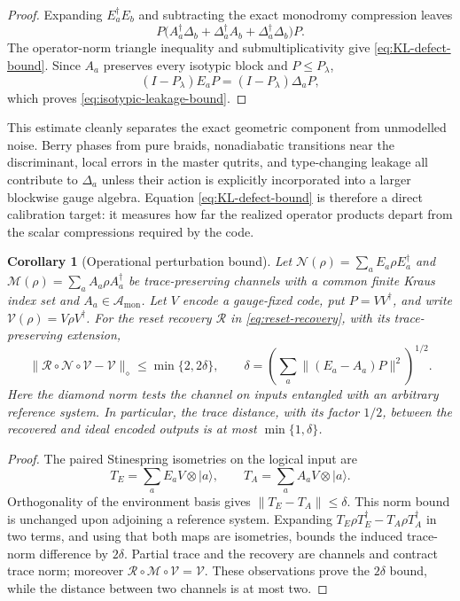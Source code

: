 \documentclass[11pt]{article}
\newtheorem{corollary}[theorem]{Corollary}
\theoremstyle{definition}
\theoremstyle{remark}
\newcommand{\cA}{\mathcal A}
\newcommand{\ket}[1]{\lvert #1\rangle}
\begin{document}
\begin{proof}
Expanding $E_a^\dagger E_b$ and subtracting the exact monodromy compression leaves
\[
 P\big(A_a^\dagger\Delta_b+\Delta_a^\dagger A_b
       +\Delta_a^\dagger\Delta_b\big)P.
\]
The operator-norm triangle inequality and submultiplicativity give \eqref{eq:KL-defect-bound}.  Since $A_a$ preserves every isotypic block and $P\leq P_\lambda$,
\[
 (I-P_\lambda)E_aP=(I-P_\lambda)\Delta_aP,
\]
which proves \eqref{eq:isotypic-leakage-bound}.
\end{proof}

This estimate cleanly separates the exact geometric component from unmodelled noise.  Berry phases from pure braids, nonadiabatic transitions near the discriminant, local errors in the master qutrits, and type-changing leakage all contribute to $\Delta_a$ unless their action is explicitly incorporated into a larger blockwise gauge algebra.  Equation \eqref{eq:KL-defect-bound} is therefore a direct calibration target: it measures how far the realized operator products depart from the scalar compressions required by the code.

\begin{corollary}[Operational perturbation bound]\label{cor:operational-perturbation}
Let $\mathcal N(\rho)=\sum_a E_a\rho E_a^\dagger$ and $\mathcal M(\rho)=\sum_a A_a\rho A_a^\dagger$ be trace-preserving channels with a common finite Kraus index set and $A_a\in\cA_{\mathrm{mon}}$.  Let $V$ encode a gauge-fixed code, put $P=VV^\dagger$, and write $\mathcal V(\rho)=V\rho V^\dagger$.  For the reset recovery $\mathcal R$ in \eqref{eq:reset-recovery}, with its trace-preserving extension,
\begin{equation}\label{eq:diamond-recovery-bound}
 \|\mathcal R\circ\mathcal N\circ\mathcal V-\mathcal V\|_\diamond
 \leq\min\{2,2\delta\},\qquad
 \delta=\left(\sum_a\|(E_a-A_a)P\|^2\right)^{1/2}.
\end{equation}
Here the diamond norm tests the channel on inputs entangled with an arbitrary reference system.  In particular, the trace distance, with its factor $1/2$, between the recovered and ideal encoded outputs is at most $\min\{1,\delta\}$.
\end{corollary}

\begin{proof}
The paired Stinespring isometries on the logical input are
\[
 T_E=\sum_a E_aV\otimes\ket a,
 \qquad T_A=\sum_a A_aV\otimes\ket a.
\]
Orthogonality of the environment basis gives $\|T_E-T_A\|\leq\delta$.  This norm bound is unchanged upon adjoining a reference system.  Expanding $T_E\rho T_E^\dagger-T_A\rho T_A^\dagger$ in two terms, and using that both maps are isometries, bounds the induced trace-norm difference by $2\delta$.  Partial trace and the recovery are channels and contract trace norm; moreover $\mathcal R\circ\mathcal M\circ\mathcal V=\mathcal V$.  These observations prove the $2\delta$ bound, while the distance between two channels is at most two.
\end{proof}
\end{document}
